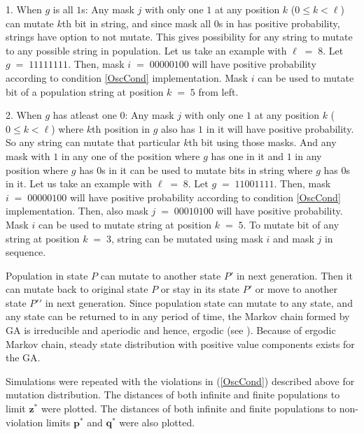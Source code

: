 1. When $g$ is all $1$s:\newline
Any mask $j$ with only one $1$ at any position $k$ ($0 \leq k < \ell$) can mutate $k$th bit in string, and since mask 
all $0$s in has positive probability, strings have option to not mutate. This gives possibility for any string to mutate to 
any possible string in population. Let us take an example with $\ell \;=\; 8$. Let $g \;=\; 11111111$. Then, mask 
$i \;=\; 00000100$ will have positive probability according to condition \ref{OscCond} implementation. 
Mask $i$ can be used to mutate bit of a population string at position $k \;=\; 5$ from left.

2. When $g$ has atleast one $0$:\newline
Any mask $j$ with only one $1$ at any position $k$ ($0 \leq k < \ell$) where $k$th position in $g$ also has $1$ in it 
will have positive probability. So any string can mutate that particular $k$th bit using those masks. And any mask 
with $1$ in any one of the position where $g$ has one in it and $1$ in any position where $g$ has $0$s in it can be used to 
mutate bits in string where $g$ has $0$s in it. Let us take an example with $\ell \;=\; 8$. Let $g \;=\; 11001111$. Then, 
mask $i \;=\; 00000100$ will have positive probability according to condition \ref{OscCond} implementation. Then, also mask 
$j \;=\; 00010100$ will have positive probability. Mask $i$ can be used to mutate string at position $k \;=\; 5$. 
To mutate bit of any string at position $k \;=\; 3$, string can be mutated using mask $i$ and mask $j$ in sequence.

Population in state $P$ can mutate to another state $P\prime$ in next generation. Then it can mutate back to original state $P$ or 
stay in its state $P\prime$ or move to another state $P\prime\prime$ in next generation. Since population state can mutate to 
any state, and any state can be returned to in any period of time, the Markov chain formed by GA is irreducible and aperiodic and hence, 
ergodic (see \cite{MarkovChain}). Because of ergodic Markov chain, steady state distribution with positive value components exists for the GA.   

Simulations were repeated with the violations in (\ref{OscCond}) described above for mutation distribution.
The distances of both infinite and finite populations to limit $\bm{z}^\ast$ were plotted. 
The distances of both infinite and finite populations to non-violation limits $\bm{p}^\ast$ and $\bm{q}^\ast$ were also plotted.

